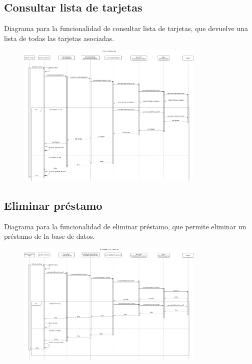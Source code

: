 \documentclass[12pt]{article}
\begin{document}
\subsection{Consultar lista de tarjetas}
Diagrama para la funcionalidad de consultar lista de tarjetas, que devuelve una lista de todas las tarjetas asociadas.
\begin{figure}[H]
    \centering
    \includegraphics[width=0.8\textwidth]{images/consultarListaTarjetas.png}
\end{figure}
\subsection{Eliminar préstamo}
Diagrama para la funcionalidad de eliminar préstamo, que permite eliminar un préstamo de la base de datos.
\begin{figure}[H]
    \centering
    \includegraphics[width=0.8\textwidth]{images/18-eliminarprestamos.png}
\end{figure}
\newpage
\end{document}
